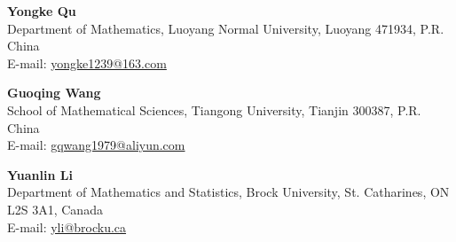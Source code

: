 \documentclass[a4paper, 12pt]{article}
\theoremstyle{definition}
\begin{document}
\noindent\textbf{Yongke Qu}\\
Department of Mathematics, Luoyang Normal University,
Luoyang 471934, P.R. China\\
E-mail: \href{mailto:yongke1239@163.com}{yongke1239@163.com}

\medskip

\noindent\textbf{Guoqing Wang}\\
School of Mathematical Sciences, Tiangong University,
Tianjin 300387, P.R. China\\
E-mail: \href{mailto:gqwang1979@aliyun.com}{gqwang1979@aliyun.com}

\medskip

\noindent\textbf{Yuanlin Li}\\
Department of Mathematics and Statistics, Brock University,
St. Catharines, ON L2S 3A1, Canada\\
E-mail: \href{mailto:yli@brocku.ca}{yli@brocku.ca}
\end{document}
